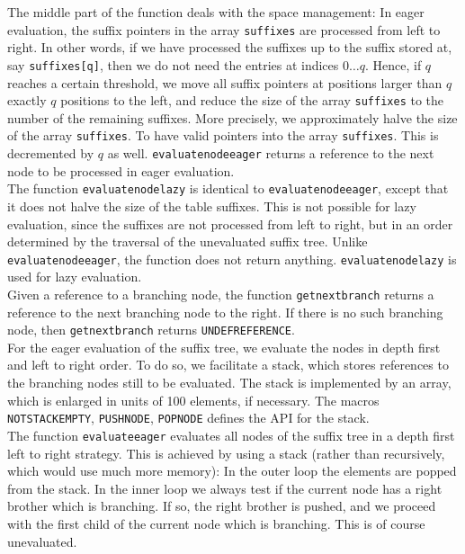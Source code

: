 \documentclass[a4paper]{article}
\begin{document}
The middle part of the function deals with the space management: In eager
evaluation, the suffix pointers in the array \texttt{suffixes} are processed
from left to right. In other words, if we have processed the suffixes up to the
suffix stored at, say \texttt{suffixes[q]}, then we do not need the entries at
indices \(0 \dots q\). Hence, if \(q\) reaches a certain threshold, we move all
suffix pointers at positions larger than \(q\) exactly \(q\) positions to the
left, and reduce the size of the array \texttt{suffixes} to the number of the
remaining suffixes. More precisely, we approximately halve the size of the
array \texttt{suffixes}. To have valid pointers into the array
\texttt{suffixes}. This is decremented by \(q\) as well.
\texttt{evaluatenodeeager} returns a reference to the next node to be processed
in eager evaluation.\\

The function \texttt{evaluatenodelazy} is identical to
\texttt{evaluatenodeeager}, except that it does not halve the size of the table
suffixes. This is not possible for lazy evaluation, since the suffixes are not
processed from left to right, but in an order determined by the traversal of
the unevaluated suffix tree. Unlike \texttt{evaluatenodeeager}, the function
does not return anything. \texttt{evaluatenodelazy} is used for lazy
evaluation.\\

Given a reference to a branching node, the function \texttt{getnextbranch}
returns a reference to the next branching node to the right. If there is no
such branching node, then \texttt{getnextbranch} returns
\texttt{UNDEFREFERENCE}.\\

For the eager evaluation of the suffix tree, we evaluate the nodes in depth
first and left to right order. To do so, we facilitate a stack, which stores
references to the branching nodes still to be evaluated. The stack is
implemented by an array, which is enlarged in units of 100 elements, if
necessary. The macros \texttt{NOTSTACKEMPTY}, \texttt{PUSHNODE},
\texttt{POPNODE} defines the API for the stack.\\

The function \texttt{evaluateeager} evaluates all nodes of the suffix tree in a
depth first left to right strategy. This is achieved by using a stack (rather
than recursively, which would use much more memory): In the outer loop the
elements are popped from the stack. In the inner loop we always test if the
current node has a right brother which is branching. If so, the right brother
is pushed, and we proceed with the first child of the current node which is
branching. This is of course unevaluated.\\
\end{document}
